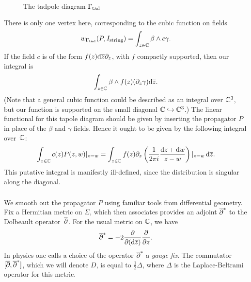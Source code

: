 \begin{figure}
\caption{The tadpole diagram $\Gamma_{\rm tad}$}
\label{fig:tadpole}
\end{figure}


There is only one vertex here, corresponding to the cubic function on fields
\[
w_{\Gamma_{\rm tad}}(P,I_{\rm string}) = \int_{z \in \mathbb C} \beta \wedge c\gamma.
\]
If the field $c$ is of the form $f(z) {\rm d} \overline{z} \partial_z$,
with $f$ compactly supported, 
then our integral is
\[
\int_{z \in \mathbb C} \beta \wedge f(z)(\partial_z\gamma) {\rm d} \overline{z}.
\]
(Note that a general cubic function could be described as an integral over $\mathbb C^3$,
but our function is supported on the small diagonal $\mathbb C \hookrightarrow \mathbb C^3$.)
The linear functional for this tapole diagram should be given by inserting the propagator $P$ in place of the $\beta$ and $\gamma$ fields. 
Hence it ought to be given by the following integral over~$\mathbb C$:
\[
\int_{z \in \mathbb C} c(z)P(z,w)|_{z = w}  
= \int_{z \in \mathbb C} f(z) \partial_z \left(  \frac{1}{2 \pi i} \frac{{\rm d} z + {\rm d} w}{z-w}\right)|_{z = w}\, {\rm d} \overline{z}.
\]
This putative integral is manifestly ill-defined,
since the distribution is singular along the diagonal.

\subsubsection{}

We smooth out the propagator $P$ using familiar tools from differential geometry.
Fix a Hermitian metric on $\Sigma$, 
which then associates provides an adjoint $\overline{\partial}^*$ to the Dolbeault operator~$\overline{\partial}$.
For the usual metric on $\mathbb C$, we have
\[
\overline{\partial}^* = -2 \frac{\partial}{\partial ({\rm d} \overline{z})} \frac{\partial}{\partial z}.
\]
In physics one calls a choice of the operator $\overline{\partial}^*$ a {\em gauge-fix}.
The commutator $[\overline{\partial},\overline{\partial}^*]$, which we will denote $D$, 
is equal to $\tfrac{1}{2} \Delta$, where $\Delta$ is the Laplace-Beltrami operator for this metric.


